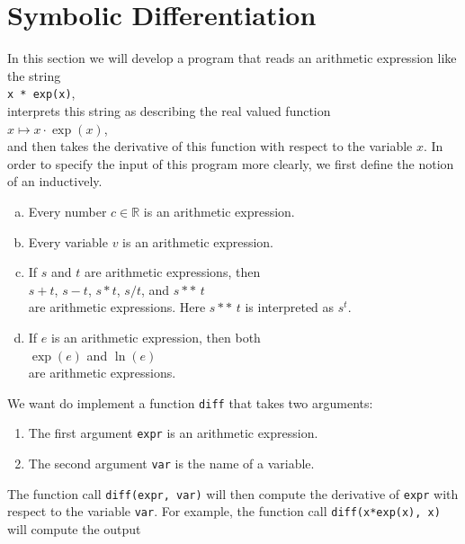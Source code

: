 \section{Symbolic Differentiation}
In this section we will develop a program that reads an arithmetic expression like the string
\\[0.2cm]
\hspace*{1.3cm}
\texttt{x * exp(x)},
\\[0.2cm]
interprets this string as describing the real valued function 
\\[0.2cm]
\hspace*{1.3cm}
$x \mapsto x \cdot \exp(x)$, 
\\[0.2cm]
and then takes the derivative of this function with respect to the variable $x$.  In order to specify the input
of this program more clearly, we first define the notion of an  inductively.
\begin{enumerate}[(a)]
\item Every number $c \in \mathbb{R}$ is an arithmetic expression.
\item Every variable $v$ is an arithmetic expression.
\item If $s$ and $t$ are arithmetic expressions, then
      \\[0.2cm]
      \hspace*{1.3cm}
      $s + t$, \quad $s - t$, \quad $s * t$, \quad $s / t$, \quad and \quad $s \,\mathtt{**}\, t$
      \\[0.2cm]
      are arithmetic expressions.  Here $s \,\mathtt{**}\, t$ is interpreted as $s^t$.
      
\item If $e$ is an arithmetic expression, then both
      \\[0.2cm]
      \hspace*{1.3cm}
      $\exp(e)$ \quad and \quad $\ln(e)$
      \\[0.2cm]
      are arithmetic expressions.
\end{enumerate}
We want do implement a function \texttt{diff} that takes two arguments:
\begin{enumerate}
\item The first argument \texttt{expr} is an arithmetic expression.
\item The second argument \texttt{var} is the name of a variable.
\end{enumerate}
The function call \texttt{diff(expr, var)} will then compute the derivative of \texttt{expr} with respect to the variable \texttt{var}.  For example, the function call \texttt{diff(x*exp(x), x)} will compute the output
